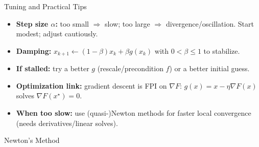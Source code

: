 \begin{frame}{Tuning and Practical Tips}
\begin{itemize}\setlength\itemsep{0.6em}
  \item \textbf{Step size $\alpha$:} too small $\Rightarrow$ slow; too large $\Rightarrow$ divergence/oscillation. Start modest; adjust cautiously.
  \item \textbf{Damping:} $x_{k+1}\!\leftarrow\! (1-\beta)x_k+\beta g(x_k)$ with $0<\beta\le 1$ to stabilize.
  \item \textbf{If stalled:} try a better $g$ (rescale/precondition $f$) or a better initial guess.
  \item \textbf{Optimization link:} gradient descent is FPI on $\nabla F$: $g(x)=x-\eta\nabla F(x)$ solves $\nabla F(x^\star)=0$.
  \item \textbf{When too slow:} use (quasi-)Newton methods for faster local convergence (needs derivatives/linear solves).
\end{itemize}
\end{frame}







\begin{frame}{Newton's Method}


\vspace{0.6em}


\vspace{0.6em}


\vspace{0.6em}


\end{frame}


